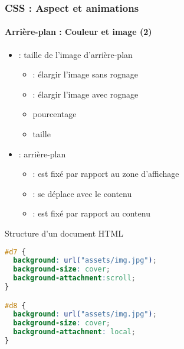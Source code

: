 \documentclass[xcolor=table]{beamer}
\begin{document}
\begin{frame}[fragile]
\frametitle{CSS : Aspect et animations}
\framesubtitle{Arrière-plan : Couleur et image (2)}

\begin{minipage}{0.60\textwidth}
	\begin{itemize}
		\item {} : taille de l'image d'arrière-plan 
		\begin{itemize}
			\item {} : élargir l'image sans rognage
			\item {} : élargir l'image avec rognage
			\item pourcentage 
			\item taille
		\end{itemize}
		\item {} : arrière-plan
		\begin{itemize}
			\item {} : est fixé par rapport au zone d'affichage
			\item {} : se déplace avec le contenu
			\item {} : est fixé par rapport au contenu
		\end{itemize}
	\end{itemize}
\end{minipage}
%
\begin{minipage}{0.38\textwidth}
\begin{exampleblock}{Structure d'un document HTML}
\lstset{escapeinside=**}
\tiny\bfseries
\begin{lstlisting}[language={CSS}]
#d7 {
  background: url("assets/img.jpg");
  background-size: cover;
  background-attachment:scroll;
}

#d8 {
  background: url("assets/img.jpg");
  background-size: cover;
  background-attachment: local;
}
\end{lstlisting}
\end{exampleblock}
\end{minipage}
\end{frame}
\end{document}
